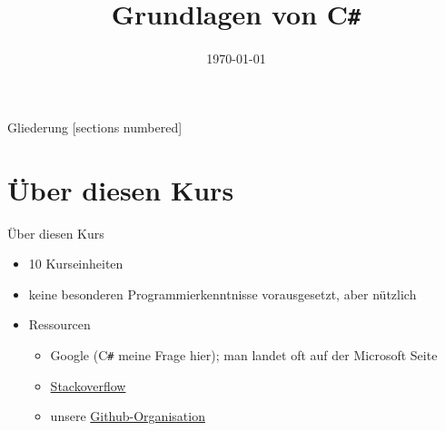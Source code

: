 



\title{Grundlagen von C\texttt{\#}}
\date{\today}




\maketitle

\begin{frame}{Gliederung}
	[sections numbered]
	\tableofcontents
\end{frame}

\section{Über diesen Kurs}
\begin{frame}{Über diesen Kurs}
	\begin{itemize}
		\item 10 Kurseinheiten
		\item keine besonderen Programmierkenntnisse vorausgesetzt, aber nützlich
		\item Ressourcen
		\begin{itemize}
			\item Google (C\texttt{\#} meine Frage hier); man landet oft auf der Microsoft Seite
			\item \href{http://stackoverflow.com/}{Stackoverflow}
			\item unsere \href{https://github.com/fsr}{Github-Organisation}
		\end{itemize}
	\end{itemize}
\end{frame}


